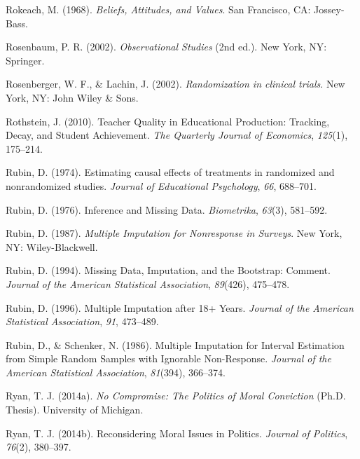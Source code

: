 \documentclass[12pt,econ]{sources/authesis}
\begin{document}
\leavevmode\hypertarget{ref-rokeach_1968_beliefs}{}%
Rokeach, M. (1968). \emph{Beliefs, Attitudes, and Values}. San Francisco, CA: Jossey-Bass.

\leavevmode\hypertarget{ref-rosenbaum_2002_observational}{}%
Rosenbaum, P. R. (2002). \emph{Observational Studies} (2nd ed.). New York, NY: Springer.

\leavevmode\hypertarget{ref-rosenberger_2002_randomization}{}%
Rosenberger, W. F., \& Lachin, J. (2002). \emph{Randomization in clinical trials}. New York, NY: John Wiley \& Sons.

\leavevmode\hypertarget{ref-rothstein_2010_teacher}{}%
Rothstein, J. (2010). Teacher Quality in Educational Production: Tracking, Decay, and Student Achievement. \emph{The Quarterly Journal of Economics}, \emph{125}(1), 175--214.

\leavevmode\hypertarget{ref-rubin_1974_estimating}{}%
Rubin, D. (1974). Estimating causal effects of treatments in randomized and nonrandomized studies. \emph{Journal of Educational Psychology}, \emph{66}, 688--701.

\leavevmode\hypertarget{ref-rubin_1976_inference}{}%
Rubin, D. (1976). Inference and Missing Data. \emph{Biometrika}, \emph{63}(3), 581--592.

\leavevmode\hypertarget{ref-rubin_1987_multiple}{}%
Rubin, D. (1987). \emph{Multiple Imputation for Nonresponse in Surveys}. New York, NY: Wiley-Blackwell.

\leavevmode\hypertarget{ref-rubin_1994_missing}{}%
Rubin, D. (1994). Missing Data, Imputation, and the Bootstrap: Comment. \emph{Journal of the American Statistical Association}, \emph{89}(426), 475--478.

\leavevmode\hypertarget{ref-rubin_1996_multiple}{}%
Rubin, D. (1996). Multiple Imputation after 18+ Years. \emph{Journal of the American Statistical Association}, \emph{91}, 473--489.

\leavevmode\hypertarget{ref-rubin_1986_multiple}{}%
Rubin, D., \& Schenker, N. (1986). Multiple Imputation for Interval Estimation from Simple Random Samples with Ignorable Non-Response. \emph{Journal of the American Statistical Association}, \emph{81}(394), 366--374.

\leavevmode\hypertarget{ref-ryan_no_2014}{}%
Ryan, T. J. (2014a). \emph{No Compromise: The Politics of Moral Conviction} (Ph.D. Thesis). University of Michigan.

\leavevmode\hypertarget{ref-ryan_reconsidering_2014}{}%
Ryan, T. J. (2014b). Reconsidering Moral Issues in Politics. \emph{Journal of Politics}, \emph{76}(2), 380--397.
\end{document}
